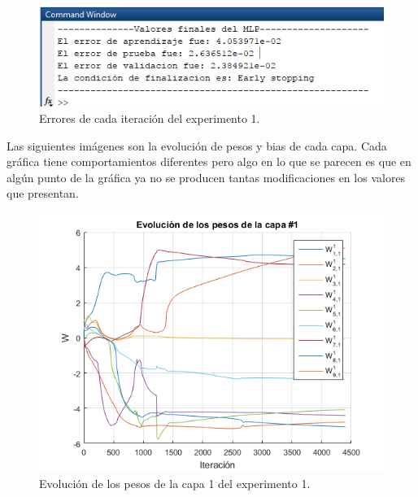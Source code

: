 \begin{figure}[H]
    \begin{center}
        \includegraphics[width=14cm]{1/salida.png}
        \caption{Errores de cada iteración del experimento 1.}
        \label{fig:salida1}
    \end{center}
\end{figure}

Las siguientes imágenes son la evolución de pesos y bias de cada capa. Cada gráfica tiene comportamientos diferentes pero algo en lo que se parecen es que en algún punto de la gráfica ya no se producen tantas modificaciones en los valores que presentan.
\begin{figure}[H]
    \begin{center}
        \includegraphics[width=16cm]{1/pesos1.png}
        \caption{Evolución de los pesos de la capa 1 del experimento 1.}
        \label{fig:pesos1}
    \end{center}
\end{figure}

